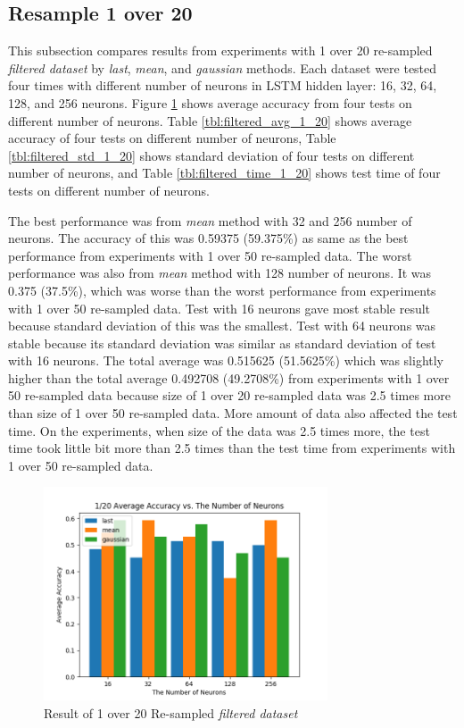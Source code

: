 \documentclass[draft,dvipsnames]{drexel-thesis}
\begin{document}
\begin{thesis}
\subsection{Resample 1 over 20}
This subsection compares results from experiments with 1 over 20 re-sampled {\em filtered dataset} by {\em last}, {\em mean}, and {\em gaussian} methods. Each dataset were tested four times with different number of neurons in LSTM hidden layer: 16, 32, 64, 128, and 256 neurons. Figure \ref{fig:filter_1_20} shows average accuracy from four tests on different number of neurons. Table \ref{tbl:filtered_avg_1_20} shows average accuracy of four tests on different number of neurons, Table \ref{tbl:filtered_std_1_20} shows standard deviation of four tests on different number of neurons, and Table \ref{tbl:filtered_time_1_20} shows test time of four tests on different number of neurons.

The best performance was from {\em mean} method with 32 and 256 number of neurons. The accuracy of this was 0.59375 (59.375\%) as same as the best performance from experiments with 1 over 50 re-sampled data. The worst performance was also from {\em mean} method with 128 number of neurons. It was 0.375 (37.5\%), which was worse than the worst performance from experiments with 1 over 50 re-sampled data. Test with 16 neurons gave most stable result because standard deviation of this was the smallest. Test with 64 neurons was stable because its standard deviation was similar as standard deviation of test with 16 neurons. The total average was 0.515625 (51.5625\%) which was slightly higher than the total average 0.492708 (49.2708\%) from experiments with 1 over 50 re-sampled data because size of 1 over 20 re-sampled data was 2.5 times more than size of 1 over 50 re-sampled data. More amount of data also affected the test time. On the experiments, when size of the data was 2.5 times more, the test time took little bit more than 2.5 times than the test time from experiments with 1 over 50 re-sampled data.

\begin{figure}[t!]
    \centering
    \includegraphics[width=0.75\textwidth]{pictures/result_pictures/filtered_1_20_result.png}
    \caption{Result of 1 over 20 Re-sampled {\em filtered dataset}}
    \label{fig:filter_1_20}
\end{figure}


\end{thesis}
\end{document}
